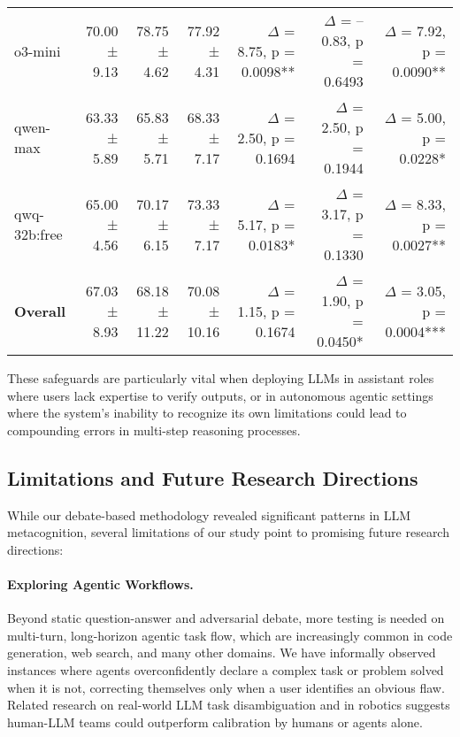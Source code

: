 \documentclass{article}
\begin{document}
\begin{table*}[htbp]
{\begin{tabular}{lrrrrrr}
    o3-mini                           & 70.00 ± 9.13  & 78.75 ± 4.62   & 77.92 ± 4.31   & $\Delta$ = 8.75, p = 0.0098**  & $\Delta$ = –0.83, p = 0.6493  & $\Delta$ = 7.92, p = 0.0090**  \\
    qwen-max                          & 63.33 ± 5.89  & 65.83 ± 5.71   & 68.33 ± 7.17   & $\Delta$ = 2.50, p = 0.1694    & $\Delta$ = 2.50, p = 0.1944  & $\Delta$ = 5.00, p = 0.0228*   \\
    qwq-32b:free                      & 65.00 ± 4.56  & 70.17 ± 6.15   & 73.33 ± 7.17   & $\Delta$ = 5.17, p = 0.0183*   & $\Delta$ = 3.17, p = 0.1330  & $\Delta$ = 8.33, p = 0.0027**  \\
    \midrule
    \textbf{Overall}                  & 67.03 ± 8.93  & 68.18 ± 11.22  & 70.08 ± 10.16  & $\Delta$ = 1.15, p = 0.1674    & $\Delta$ = 1.90, p = 0.0450* & $\Delta$ = 3.05, p = 0.0004*** \\
    \bottomrule
  \end{tabular}
  }
\end{table*}


These safeguards are particularly vital when deploying LLMs in assistant roles where users lack expertise to verify outputs, or in autonomous agentic settings where the system's inability to recognize its own limitations could lead to compounding errors in multi-step reasoning processes.

\subsection{Limitations and Future Research Directions}
\label{subsec:limitations_future}

While our debate-based methodology revealed significant patterns in LLM metacognition, several limitations of our study point to promising future research directions:

\paragraph{Exploring Agentic Workflows.} Beyond static question-answer and adversarial debate, more testing is needed on multi-turn, long-horizon agentic task flow, which are increasingly common in code generation, web search, and many other domains. We have informally observed instances where agents overconfidently declare a complex task or problem solved when it is not, correcting themselves only when a user identifies an obvious flaw. Related research on real-world LLM task disambiguation \citep{hu2024uncertaintythoughtsuncertaintyawareplanning,kobalczyk2025activetaskdisambiguationllms} and in robotics \citep{liang2025introspectiveplanningaligningrobots,ren2023robotsaskhelpuncertainty} suggests human-LLM teams could outperform calibration by humans or agents alone.
\end{document}
